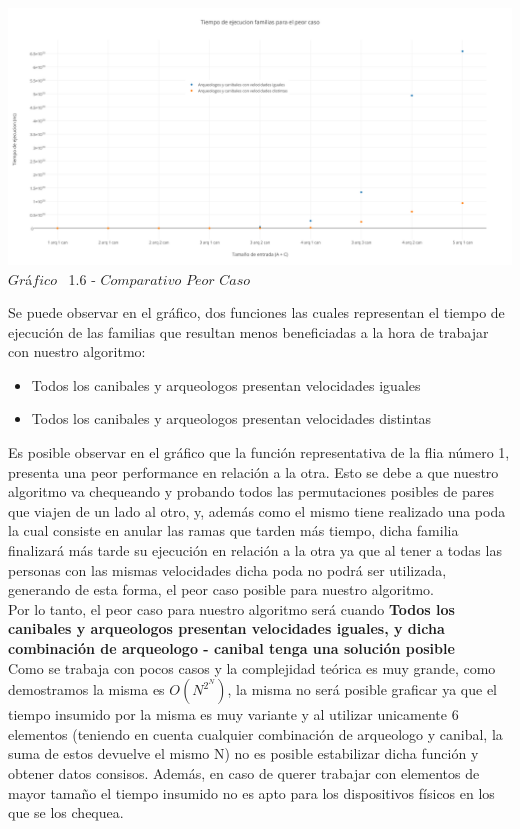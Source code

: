  \vspace*{0.3cm} \vspace*{0.3cm}
  \begin{center}
 \includegraphics[scale=0.45]{./EJ1/comparativopeorcaso.png}
 {$Gr$\'a$fico$ \ 1.6 - $Comparativo$ $Peor$ $Caso$}
  \end{center}
  \vspace*{0.3cm}

Se puede observar en el gr\'afico, dos funciones las cuales representan el tiempo de ejecuci\'on de las familias que resultan menos beneficiadas a la hora de trabajar con nuestro algoritmo:\\
\begin{itemize}
\item Todos los canibales y arqueologos presentan velocidades iguales
\item Todos los canibales y arqueologos presentan velocidades distintas
\end{itemize}

Es posible observar en el gr\'afico que la funci\'on representativa de la flia n\'umero 1, presenta una peor performance en relaci\'on a la otra. Esto se debe a que nuestro algoritmo va chequeando y probando todos las permutaciones posibles de pares que viajen de un lado al otro, y, adem\'as como el mismo tiene realizado una poda la cual consiste en anular las ramas que tarden m\'as tiempo, dicha familia finalizar\'a m\'as tarde su ejecuci\'on en relaci\'on a la otra ya que al tener a todas las personas con las mismas velocidades dicha poda no podr\'a ser utilizada, generando de esta forma, el peor caso posible para nuestro algoritmo.\\

Por lo tanto, el peor caso para nuestro algoritmo ser\'a cuando \textbf{Todos los canibales y arqueologos presentan velocidades iguales, y dicha combinaci\'on de arqueologo - canibal tenga una soluci\'on posible}\\

Como se trabaja con pocos casos y la complejidad te\'orica es muy grande, como demostramos la misma es $O(N^{2^{N}})$, la misma no ser\'a posible graficar ya que el tiempo insumido por la misma es muy variante y al utilizar unicamente 6 elementos (teniendo en cuenta cualquier combinaci\'on de arqueologo y canibal, la suma de estos devuelve el mismo N) no es posible estabilizar dicha funci\'on y obtener datos consisos. Adem\'as, en caso de querer trabajar con elementos de mayor tamaño el tiempo insumido no es apto para los dispositivos f\'isicos en los que se los chequea.

